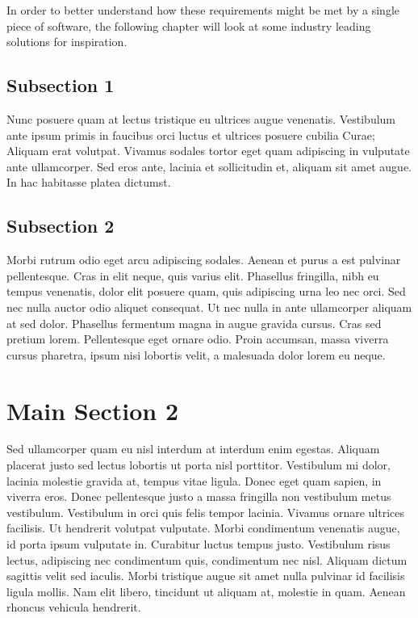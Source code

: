 \documentclass[../main.tex]{subfiles}
\begin{document}
In order to better understand how these requirements might be met by a single
piece of software, the following chapter will look at some industry leading
solutions for inspiration.

\subsection{Subsection 1}

Nunc posuere quam at lectus tristique eu ultrices augue venenatis. Vestibulum ante ipsum primis in faucibus orci luctus et ultrices posuere cubilia Curae; Aliquam erat volutpat. Vivamus sodales tortor eget quam adipiscing in vulputate ante ullamcorper. Sed eros ante, lacinia et sollicitudin et, aliquam sit amet augue. In hac habitasse platea dictumst.


\subsection{Subsection 2}
Morbi rutrum odio eget arcu adipiscing sodales. Aenean et purus a est pulvinar pellentesque. Cras in elit neque, quis varius elit. Phasellus fringilla, nibh eu tempus venenatis, dolor elit posuere quam, quis adipiscing urna leo nec orci. Sed nec nulla auctor odio aliquet consequat. Ut nec nulla in ante ullamcorper aliquam at sed dolor. Phasellus fermentum magna in augue gravida cursus. Cras sed pretium lorem. Pellentesque eget ornare odio. Proin accumsan, massa viverra cursus pharetra, ipsum nisi lobortis velit, a malesuada dolor lorem eu neque.


\section{Main Section 2}

Sed ullamcorper quam eu nisl interdum at interdum enim egestas. Aliquam placerat justo sed lectus lobortis ut porta nisl porttitor. Vestibulum mi dolor, lacinia molestie gravida at, tempus vitae ligula. Donec eget quam sapien, in viverra eros. Donec pellentesque justo a massa fringilla non vestibulum metus vestibulum. Vestibulum in orci quis felis tempor lacinia. Vivamus ornare ultrices facilisis. Ut hendrerit volutpat vulputate. Morbi condimentum venenatis augue, id porta ipsum vulputate in. Curabitur luctus tempus justo. Vestibulum risus lectus, adipiscing nec condimentum quis, condimentum nec nisl. Aliquam dictum sagittis velit sed iaculis. Morbi tristique augue sit amet nulla pulvinar id facilisis ligula mollis. Nam elit libero, tincidunt ut aliquam at, molestie in quam. Aenean rhoncus vehicula hendrerit.
\end{document}
